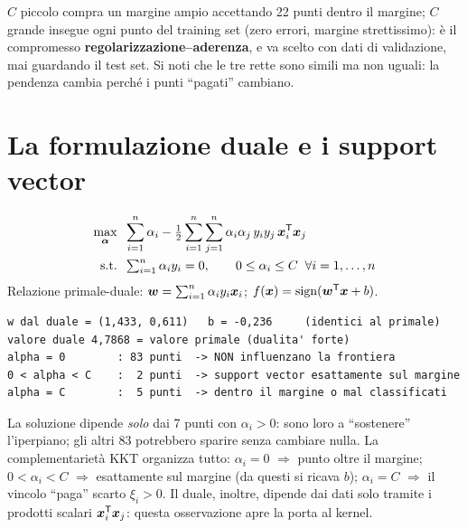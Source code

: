\begin{insight}
$C$ piccolo compra un margine ampio accettando 22 punti dentro il margine; $C$ grande
insegue ogni punto del training set (zero errori, margine strettissimo): è il
compromesso \textbf{regolarizzazione--aderenza}, e va scelto con dati di validazione,
mai guardando il test set. Si noti che le tre rette sono simili ma non uguali:
la pendenza cambia perché i punti ``pagati'' cambiano.
\end{insight}

\section{La formulazione duale e i support vector}

\begin{modello}
\begin{align*}
\max_{\boldsymbol{\alpha}}\;\; & \sum_{i=1}^{n} \alpha_i - \tfrac12 \sum_{i=1}^{n}\sum_{j=1}^{n} \alpha_i \alpha_j\,
   y_i y_j\, \boldsymbol{x}_i^{\mathsf T} \boldsymbol{x}_j \\
\text{s.t.}\;\; & \textstyle\sum_{i=1}^{n} \alpha_i y_i = 0, \qquad 0 \le \alpha_i \le C \;\;\forall i = 1, \dots, n
\end{align*}
Relazione primale-duale: $\boldsymbol{w} = \sum_{i=1}^{n} \alpha_i y_i \boldsymbol{x}_i$;\;
$f(\boldsymbol{x}) = \mathrm{sign}(\boldsymbol{w}^{\mathsf T} \boldsymbol{x} + b)$.
\end{modello}

\begin{lstlisting}[style=output]
w dal duale = (1,433, 0,611)   b = -0,236     (identici al primale)
valore duale 4,7868 = valore primale (dualita' forte)
alpha = 0        : 83 punti  -> NON influenzano la frontiera
0 < alpha < C    :  2 punti  -> support vector esattamente sul margine
alpha = C        :  5 punti  -> dentro il margine o mal classificati
\end{lstlisting}

\begin{spiegazione}
La soluzione dipende \emph{solo} dai 7 punti con $\alpha_i > 0$: sono loro a
``sostenere'' l'iperpiano; gli altri 83 potrebbero sparire senza cambiare nulla. La
complementarietà KKT organizza tutto: $\alpha_i = 0$ $\Rightarrow$ punto oltre il
margine; $0 < \alpha_i < C$ $\Rightarrow$ esattamente sul margine
(da questi si ricava $b$); $\alpha_i = C$ $\Rightarrow$ il vincolo ``paga'' scarto
$\xi_i > 0$. Il duale, inoltre, dipende dai dati solo tramite i prodotti scalari
$\boldsymbol{x}_i^{\mathsf T} \boldsymbol{x}_j$: questa osservazione apre la porta al kernel.
\end{spiegazione}

